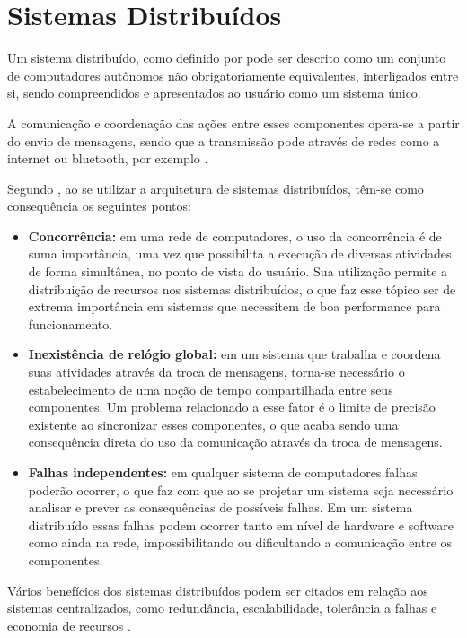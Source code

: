 \section{Sistemas Distribuídos}

Um sistema distribuído, como definido por  pode ser descrito como um conjunto de computadores autônomos não obrigatoriamente equivalentes, interligados entre si, sendo compreendidos e apresentados ao usuário como um sistema único.

A comunicação e coordenação das ações entre esses componentes opera-se a partir do envio de mensagens, sendo que a transmissão pode através de redes como a internet ou bluetooth, por exemplo \cite{coulouris2013sistemas}. 

Segundo , ao se utilizar a arquitetura de sistemas distribuídos, têm-se como consequência os seguintes pontos:

\begin{itemize}
    \item \textbf{Concorrência:} em uma rede de computadores, o uso da concorrência é de suma importância, uma vez que possibilita a execução de diversas atividades de forma simultânea, no ponto de vista do usuário. Sua utilização permite a distribuição de recursos nos sistemas distribuídos, o que faz esse tópico ser de extrema importância em sistemas que necessitem de boa performance para funcionamento.
    
    \item \textbf{Inexistência de relógio global:} em um sistema que trabalha e coordena suas atividades através da troca de mensagens, torna-se necessário o estabelecimento de uma noção de tempo compartilhada entre seus componentes. Um problema relacionado a esse fator é o limite de precisão existente ao sincronizar esses componentes, o que acaba sendo uma consequência direta do uso da comunicação através da troca de mensagens.
    
    \item \textbf{Falhas independentes:} em qualquer sistema de computadores falhas poderão ocorrer, o que faz com que ao se projetar um sistema seja necessário analisar e prever as consequências de possíveis falhas. Em um sistema distribuído essas falhas podem ocorrer tanto em nível de hardware e software como ainda na rede, impossibilitando ou dificultando a comunicação entre os componentes.
\end{itemize}

Vários benefícios dos sistemas distribuídos podem ser citados em relação aos sistemas centralizados, como redundância, escalabilidade, tolerância a falhas e economia de recursos \cite{puder2011distributed}.

